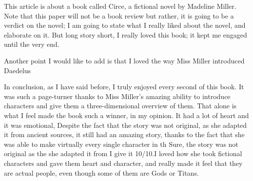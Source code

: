 \documentclass[12pt, a4paper]{article}
\begin{document}
This article is about a book called Circe, a fictional novel by Madeline Miller. Note that this paper will not be a book review but rather, it is going to be a verdict on the novel; I am going to state what I really liked about the novel, and elaborate on it.  But long story short, I really loved this book; it kept me engaged until the very end.

Another point I would like to add is that I loved the way Miss Miller introduced Daedelus 

In conclusion, as I have said before, I truly enjoyed every second of this book. It was such a page-turner thanks to Miss Miller's amazing ability to introduce characters and give them a three-dimensional overview of them. That alone is what I feel made the book such a winner, in my opinion. It had a lot of heart and it was emotional, Despite the fact that the story was not original, as she adapted it from ancient sources, it still had an amazing story, thanks to the fact that she was able to make virtually every single character in th Sure, the story was not original as the she adapted it from I give it 10/10.I loved how she took fictional characters and gave them heart and character, and really made it feel that they are actual people, even though some of them are Gods or Titans.

\newpage
\printbibliography
\end{document}
